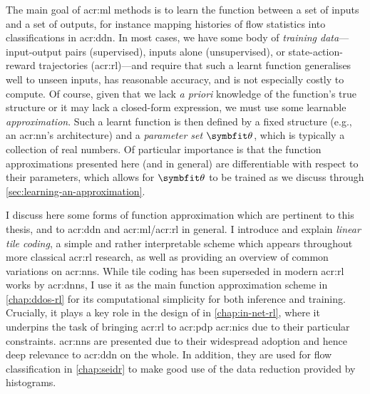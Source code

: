 The main goal of \gls{acr:ml} methods is to learn the function between a set of inputs and a set of outputs, for instance mapping histories of flow statistics into classifications in \gls{acr:ddn}.
In most cases, we have some body of \emph{training data}---input-output pairs (supervised), inputs alone (unsupervised), or state-action-reward trajectories (\gls{acr:rl})---and require that such a learnt function generalises well to unseen inputs, has reasonable accuracy, and is not especially costly to compute.
Of course, given that we lack \emph{a priori} knowledge of the function's true structure or it may lack a closed-form expression, we must use some learnable \emph{approximation}.
Such a learnt function is then defined by a fixed structure (e.g., an \gls{acr:nn}'s architecture) and a \emph{parameter set} $\wvec{}$, which is typically a collection of real numbers.
Of particular importance is that the function approximations presented here (and in general) are differentiable with respect to their parameters, which allows for $\wvec{}$ to be trained as we discuss through \cref{sec:learning-an-approximation}.

I discuss here some forms of function approximation which are pertinent to this thesis, and to \gls{acr:ddn} and \gls{acr:ml}/\gls{acr:rl} in general.
I introduce and explain \emph{linear tile coding}, a simple and rather interpretable scheme which appears throughout more classical \gls{acr:rl} research, as well as providing an overview of common variations on \glspl{acr:nn}.
While tile coding has been superseded in modern \gls{acr:rl} works by \glspl{acr:dnn}, I use it as the main function approximation scheme in \cref{chap:ddos-rl} for its computational simplicity for both inference and training.
Crucially, it plays a key role in the design of \approachshort{} in \cref{chap:in-net-rl}, where it underpins the task of bringing \gls{acr:rl} to \gls{acr:pdp} \glspl{acr:nic} due to their particular constraints.
\glspl{acr:nn} are presented due to their widespread adoption and hence deep relevance to \gls{acr:ddn} on the whole.
In addition, they are used for flow classification in \cref{chap:seidr} to make good use of the data reduction provided by \seidr{} histograms.

%
%
%
%
%
%
%
%


